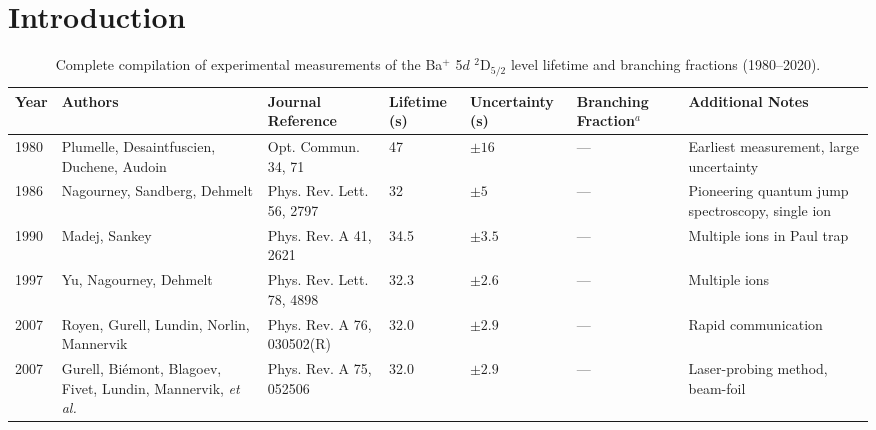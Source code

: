 \documentclass[12pt]{report}
\begin{document}
\tableofcontents

\chapter{Introduction}

\begin{table}[htbp]

\centering %

\caption{Complete compilation of experimental measurements of the Ba$^+$ 5$d$ $^2$D$_{5/2}$ level lifetime and branching fractions (1980--2020).} %

\label{tab:ba_lifetime_full} %

\footnotesize

\begin{tabular}{p{0.7cm}p{3.5cm}p{3cm}p{1.5cm}p{2cm}p{2.5cm}p{4cm}}

\hline\hline %

Year & Authors & Journal Reference & Lifetime (s) & Uncertainty (s) & Branching Fraction$^a$ & Additional Notes \\

\hline %

1980 & Plumelle, Desaintfuscien, Duchene, Audoin & Opt. Commun. 34, 71 & 47 & $\pm 16$ & --- & Earliest measurement, large uncertainty \\[0.5ex]

1986 & Nagourney, Sandberg, Dehmelt & Phys. Rev. Lett. 56, 2797 & 32 & $\pm 5$ & --- & Pioneering quantum jump spectroscopy, single ion \\[0.5ex]

1990 & Madej, Sankey & Phys. Rev. A 41, 2621 & 34.5 & $\pm 3.5$ & --- & Multiple ions in Paul trap \\[0.5ex]

1997 & Yu, Nagourney, Dehmelt & Phys. Rev. Lett. 78, 4898 & 32.3 & $\pm 2.6$ & --- & Multiple ions \\[0.5ex]

2007 & Royen, Gurell, Lundin, Norlin, Mannervik & Phys. Rev. A 76, 030502(R) & 32.0 & $\pm 2.9$ & --- & Rapid communication \\[0.5ex]

2007 & Gurell, Bi\'{e}mont, Blagoev, Fivet, Lundin, Mannervik, \textit{et al.} & Phys. Rev. A 75, 052506 & 32.0 & $\pm 2.9$ & --- & Laser-probing method, beam-foil \\[0.5ex]


\end{tabular}
\end{table}
\end{document}
